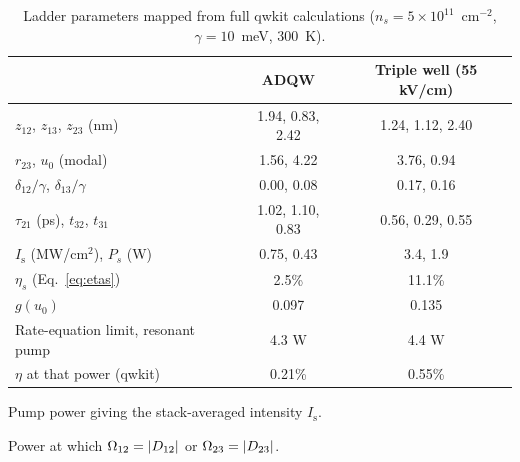 \documentclass[11pt]{article}
\newcommand{\Is}{I_\mathrm{s}}
\let\hbar\relax\DeclareRobustCommand{\hbar}{{\mathchar'26\mkern-9mu h}}
\begin{document}
\begin{table}[t]
\centering\small
\begin{threeparttable}
\caption{Ladder parameters mapped from full qwkit calculations ($n_s=5\times10^{11}$~cm$^{-2}$, $\gamma=10$~meV, 300~K).}
\label{tab:map}
\begin{tabular}{lcc}
\toprule
 & ADQW & Triple well (55 kV/cm)\\
\midrule
$z_{12}$, $z_{13}$, $z_{23}$ (nm) & 1.94, 0.83, 2.42 & 1.24, 1.12, 2.40\\
$r_{23}$, $u_0$ (modal) & 1.56, 4.22 & 3.76, 0.94\\
$\delta_{12}/\gamma$, $\delta_{13}/\gamma$ & 0.00, 0.08 & 0.17, 0.16\\
$\tau_{21}$ (ps), $t_{32}$, $t_{31}$ & 1.02, 1.10, 0.83 & 0.56, 0.29, 0.55\\
$\Is$ (MW/cm$^2$), $P_s$ (W)\tnote{a} & 0.75, 0.43 & 3.4, 1.9\\
$\eta_s$ (Eq.~\ref{eq:etas}) & 2.5\% & 11.1\%\\
$g(u_0)$ & 0.097 & 0.135\\
Rate-equation limit, resonant pump\tnote{b} & 4.3 W & 4.4 W\\
$\eta$ at that power (qwkit) & 0.21\% & 0.55\%\\
\bottomrule
\end{tabular}
\begin{tablenotes}\footnotesize
\item[a] Pump power giving the stack-averaged intensity $\Is$.
\item[b] Power at which $\hbar\Omega_{12}=|D_{12}|$ or $\hbar\Omega_{23}=|D_{23}|$.
\end{tablenotes}
\end{threeparttable}
\end{table}
\end{document}
